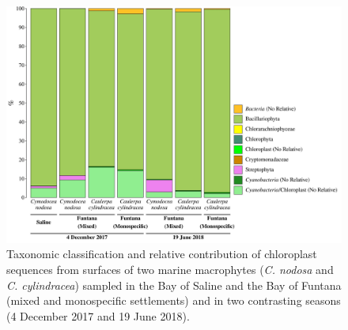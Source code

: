 \documentclass[12pt,]{article}
\begin{document}
\newpage
\begin{figure}[ht]

{\centering \includegraphics[width=1\linewidth]{../results/figures/chloroplast} 

}

\caption{Taxonomic classification and relative contribution of chloroplast sequences from surfaces of two marine macrophytes (\textit{C. nodosa} and \textit{C. cylindracea}) sampled in the Bay of Saline and the Bay of Funtana (mixed and monospecific settlements) and in two contrasting seasons (4 December 2017 and 19 June 2018).\label{chloroplast}}\label{fig:unnamed-chunk-4}
\end{figure}
\end{document}
